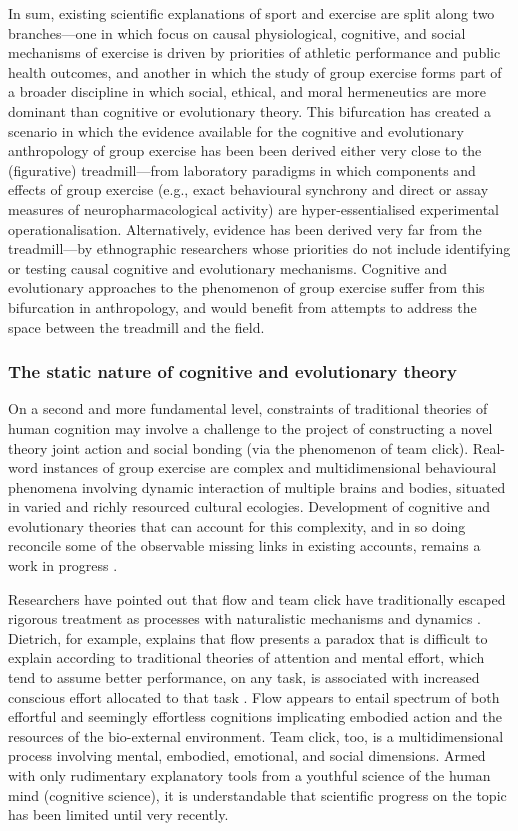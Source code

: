 \begin{CJK}{UTF8}{gbsn}
In sum, existing scientific explanations of sport and exercise are split along two branches---one in which focus on causal physiological, cognitive, and social mechanisms of exercise is driven by priorities of athletic performance and public health outcomes, and another in which the study of group exercise forms part of a broader discipline in which social, ethical, and moral hermeneutics are more dominant than cognitive or evolutionary theory.  This bifurcation has created a scenario in which the evidence available for the cognitive and evolutionary anthropology of group exercise has been been derived either very close to the (figurative) treadmill---from laboratory paradigms in which components and effects of group exercise (e.g., exact behavioural synchrony and direct or assay measures of neuropharmacological activity) are hyper-essentialised experimental operationalisation.  Alternatively, evidence has been derived very far from the treadmill---by ethnographic researchers whose priorities do not include identifying or testing causal cognitive and evolutionary mechanisms.  Cognitive and evolutionary approaches to the phenomenon of group exercise suffer from this bifurcation in anthropology, and would benefit from attempts to address the space between the treadmill and the field.

\subsubsection{The static nature of cognitive and evolutionary theory}
On a second and more fundamental level, constraints of traditional theories of human cognition may involve a challenge to the project of constructing a novel theory joint action and social bonding (via the phenomenon of team click).  Real-word instances of group exercise are complex and multidimensional behavioural phenomena involving dynamic interaction of multiple brains and bodies, situated in varied and richly resourced cultural ecologies.  Development of cognitive and evolutionary theories that can account for this complexity, and in so doing reconcile some of the observable missing links in existing accounts, remains a work in progress \citep{Fuentes2016}.

Researchers have pointed out that flow and team click have traditionally escaped rigorous treatment as processes with naturalistic mechanisms and dynamics \citep{Dietrich2010a,Slingerland2014}. Dietrich, for example, explains that flow presents a paradox that is difficult to explain according to traditional theories of attention and mental effort, which tend to assume better performance, on any task, is associated with increased conscious effort allocated to that task \citep{Dietrich2004b}.  Flow appears to entail spectrum of both effortful and seemingly effortless cognitions implicating embodied action and the resources of the bio-external environment.  Team click, too, is a multidimensional process involving mental, embodied, emotional, and social dimensions.  Armed with only rudimentary explanatory tools from a youthful science of the human mind (cognitive science), it is understandable that scientific progress on the topic has been limited until very recently.


\end{CJK}
